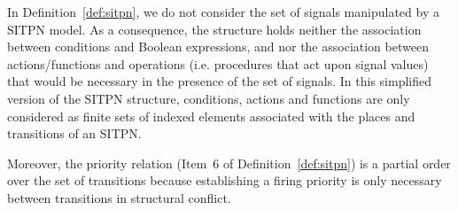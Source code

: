 \documentclass[pdflatex,sn-mathphys]{sn-jnl}%
\theoremstyle{thmstyleone}%
\theoremstyle{thmstyletwo}%
\theoremstyle{thmstylethree}%
\begin{document}

In Definition~\ref{def:sitpn}, we do not consider the set of \vhdl{}
signals manipulated by a SITPN model. As a consequence, the structure
holds neither the association between conditions and Boolean
expressions, and nor the association between actions/functions and
operations (i.e. \vhdl{} procedures that act upon signal values) that
would be necessary in the presence of the set of \vhdl{} signals.  In
this simplified version of the SITPN structure, conditions, actions
and functions are only considered as finite sets of indexed elements
associated with the places and transitions of an SITPN.

Moreover, the priority relation (Item~6 of Definition~\ref{def:sitpn})
is a partial order over the set of transitions because establishing a
firing priority is only necessary between transitions in structural
conflict.




\end{document}
